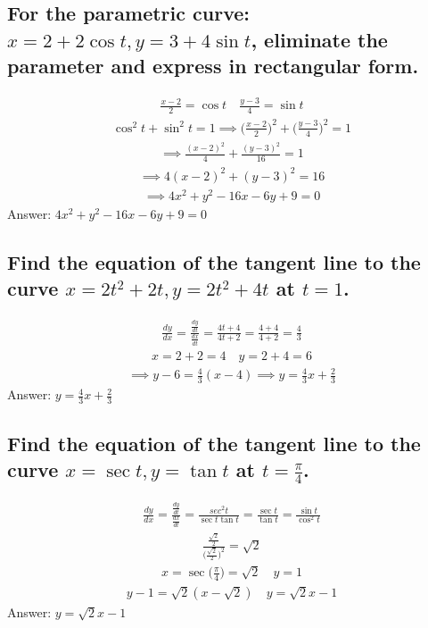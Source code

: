 \documentclass{article}
\begin{document}
\subsection{For the parametric curve: $x = 2 + 2\cos{t}, y = 3 + 4\sin{t}$, eliminate the parameter and express in rectangular form.}
\begin{align*}
	\frac{x - 2}{2} = \cos{t} \quad \frac{y - 3}{4} = \sin{t}
\end{align*}
\begin{align*}
	\cos^2{t} + \sin^2{t} = 1 \implies \bigg( \frac{x - 2}{2} \bigg)^2 + \bigg(\frac{y - 3}{4} \bigg)^2 = 1
\end{align*}
\begin{align*}
	\implies \frac{(x -2)^2}{4} + \frac{(y - 3)^2}{16} = 1
\end{align*}
\begin{align*}
	\implies 4(x - 2)^2 + (y - 3)^2 = 16
\end{align*}
\begin{align*}
	\implies 4x^2 + y^2 - 16x - 6y +9 = 0
\end{align*}
Answer: $4x^2 + y^2 - 16x - 6y +9 = 0$

\subsection{Find the equation of the tangent line to the curve $x = 2t^2 + 2t, y = 2t^2 + 4t$ at $t = 1$.}
\begin{align*}
	\frac{dy}{dx} = \frac{\frac{dy}{dt}}{\frac{dx}{dt}} = \frac{4t + 4}{4t +2} = \frac{4 + 4}{4 + 2} = \frac{4}{3}
\end{align*}
\begin{align*}
	x = 2 + 2 = 4 \quad y = 2 + 4 = 6
\end{align*}
\begin{align*}
	\implies y - 6 = \frac{4}{3}(x - 4) \implies y = \frac{4}{3}x + \frac{2}{3}
\end{align*}
Answer: $y = \frac{4}{3}x + \frac{2}{3}$

\subsection{Find the equation of the tangent line to the curve $x = \sec{t}, y = \tan{t}$ at $t = \frac{\pi}{4}$.}
\begin{align*}
	\frac{dy}{dx} = \frac{\frac{dy}{dt}}{\frac{dx}{dt}} = \frac{sec^2{t}}{\sec{t}\tan{t}} = \frac{\sec{t}}{\tan{t}} = \frac{\sin{t}}{\cos^2{t}}
\end{align*}
\begin{align*}
	\frac{\frac{\sqrt{2}}{2}}{\bigg( \frac{\sqrt{2}}{2} \bigg)^2} = \sqrt{2}
\end{align*}
\begin{align*}
	x = \sec{\bigg( \frac{\pi}{4} \bigg)} = \sqrt{2} \quad y = 1
\end{align*}
\begin{align*}
	y - 1 = \sqrt{2} ( x - \sqrt{2}) \quad y = \sqrt{2}x - 1
\end{align*}
Answer: $y = \sqrt{2}x - 1$
\end{document}
